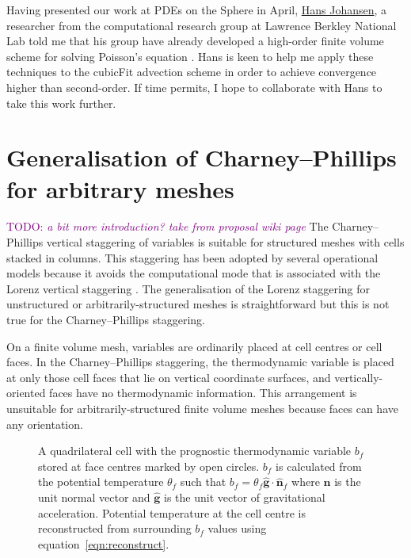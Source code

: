 \documentclass[a4paper,11pt]{article}
\newcommand{\TODO}[1]{\textcolor{purple}{TODO: \emph{#1}}}
\begin{document}
Having presented our work at PDEs on the Sphere in April, \href{http://crd.lbl.gov/departments/applied-mathematics/ANAG/about/staff-and-postdocs/hans-johansen/}{Hans Johansen}, a researcher from the computational research group at Lawrence Berkley National Lab told me that his group have already developed a high-order finite volume scheme for solving Poisson's equation \citep{devendran2015}.  Hans is keen to help me apply these techniques to the cubicFit advection scheme in order to achieve convergence higher than second-order.  If time permits, I hope to collaborate with Hans to take this work further.

\section{Generalisation of Charney--Phillips for arbitrary meshes}

\TODO{a bit more introduction? take from proposal wiki page}
The Charney--Phillips vertical staggering of variables \citep{charney-phillips1953} is suitable for structured meshes with cells stacked in columns. This staggering has been adopted by several operational models \citep{davies2005,yang2007,girard2014} because it avoids the computational mode that is associated with the Lorenz vertical staggering \citep{arakawa-konor1996}. The generalisation of the Lorenz staggering for unstructured or arbitrarily-structured meshes is straightforward \citep{weller-shahrokhi2014} but this is not true for the Charney--Phillips staggering.

On a finite volume mesh, variables are ordinarily placed at cell centres or cell faces. In the Charney--Phillips staggering, the thermodynamic variable is placed at only those cell faces that lie on vertical coordinate surfaces, and vertically-oriented faces have no thermodynamic information. This arrangement is unsuitable for arbitrarily-structured finite volume meshes because faces can have any orientation.

\begin{figure}
\centering

	\caption{A quadrilateral cell with the prognostic thermodynamic variable $b_f$ stored at face centres marked by open circles.  $b_f$ is calculated from the potential temperature $\theta_f$ such that $b_f = \theta_f \mathbf{\hat{g}} \cdot \mathbf{\hat{n}}_f$ where $\mathbf{\hat{n}}$ is the unit normal vector and $\mathbf{\hat{g}}$ is the unit vector of gravitational acceleration.  Potential temperature at the cell centre is reconstructed from surrounding $b_f$ values using equation~\eqref{eqn:reconstruct}.}
\label{fig:cp-staggering}
\end{figure}
\end{document}
